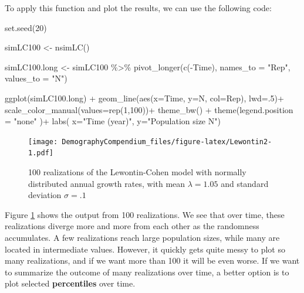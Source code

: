 \documentclass[
]{book}
\newenvironment{Shaded}{\begin{snugshade}}{\end{snugshade}}
\newcommand{\AttributeTok}[1]{\textcolor[rgb]{0.77,0.63,0.00}{#1}}
\newcommand{\DecValTok}[1]{\textcolor[rgb]{0.00,0.00,0.81}{#1}}
\newcommand{\FunctionTok}[1]{\textcolor[rgb]{0.00,0.00,0.00}{#1}}
\newcommand{\NormalTok}[1]{#1}
\newcommand{\OtherTok}[1]{\textcolor[rgb]{0.56,0.35,0.01}{#1}}
\newcommand{\SpecialCharTok}[1]{\textcolor[rgb]{0.00,0.00,0.00}{#1}}
\newcommand{\StringTok}[1]{\textcolor[rgb]{0.31,0.60,0.02}{#1}}
\begin{document}
To apply this function and plot the results, we can use the following code:

\begin{Shaded}
\begin{Highlighting}[]
\FunctionTok{set.seed}\NormalTok{(}\DecValTok{20}\NormalTok{) }

\NormalTok{simLC100 }\OtherTok{\textless{}{-}} \FunctionTok{nsimLC}\NormalTok{()}

\NormalTok{simLC100.long }\OtherTok{\textless{}{-}}\NormalTok{ simLC100 }\SpecialCharTok{\%\textgreater{}\%} \FunctionTok{pivot\_longer}\NormalTok{(}\FunctionTok{c}\NormalTok{(}\SpecialCharTok{{-}}\NormalTok{Time),}
               \AttributeTok{names\_to =} \StringTok{"Rep"}\NormalTok{, }\AttributeTok{values\_to =} \StringTok{"N"}\NormalTok{)}

\FunctionTok{ggplot}\NormalTok{(simLC100.long) }\SpecialCharTok{+} 
  \FunctionTok{geom\_line}\NormalTok{(}\FunctionTok{aes}\NormalTok{(}\AttributeTok{x=}\NormalTok{Time, }\AttributeTok{y=}\NormalTok{N, }\AttributeTok{col=}\NormalTok{Rep), }\AttributeTok{lwd=}\NormalTok{.}\DecValTok{5}\NormalTok{)}\SpecialCharTok{+}
  \FunctionTok{scale\_color\_manual}\NormalTok{(}\AttributeTok{values=}\FunctionTok{rep}\NormalTok{(}\DecValTok{1}\NormalTok{,}\DecValTok{100}\NormalTok{))}\SpecialCharTok{+}
  \FunctionTok{theme\_bw}\NormalTok{() }\SpecialCharTok{+}
   \FunctionTok{theme}\NormalTok{(}\AttributeTok{legend.position =} \StringTok{"none"}\NormalTok{ )}\SpecialCharTok{+}
  \FunctionTok{labs}\NormalTok{( }\AttributeTok{x=}\StringTok{"Time (year)"}\NormalTok{, }\AttributeTok{y=}\StringTok{"Population size N"}\NormalTok{)  }
\end{Highlighting}
\end{Shaded}

\begin{figure}
\centering
\texttt{[image: DemographyCompendium\_files/figure-latex/Lewontin2-1.pdf]}
\caption{\label{fig:Lewontin2}100 realizations of the Lewontin-Cohen model with normally distributed annual growth rates, with mean \(\lambda=1.05\) and standard deviation \(\sigma=.1\)}
\end{figure}

Figure \ref{fig:Lewontin2} shows the output from 100 realizations. We see that over time, these realizations diverge more and more from each other as the randomness accumulates. A few realizations reach large population sizes, while many are located in intermediate values. However, it quickly gets quite messy to plot so many realizations, and if we want more than 100 it will be even worse. If we want to summarize the outcome of many realizations over time, a better option is to plot selected \textbf{percentiles} over time.
\end{document}

